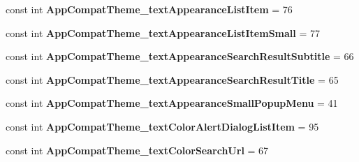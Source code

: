 \begin{DoxyCompactItemize}
\item 
\mbox{\label{class_sample_app_1_1_droid_1_1_resource_1_1_styleable_a657ffddd9420e1368d24740063a49692}} 
const int {\bfseries App\+Compat\+Theme\+\_\+text\+Appearance\+List\+Item} = 76
\item 
\mbox{\label{class_sample_app_1_1_droid_1_1_resource_1_1_styleable_a0c5ccfd82d5811970eedebaaf4e9ea7a}} 
const int {\bfseries App\+Compat\+Theme\+\_\+text\+Appearance\+List\+Item\+Small} = 77
\item 
\mbox{\label{class_sample_app_1_1_droid_1_1_resource_1_1_styleable_a68c57e4969f1bf7855de4f025a327394}} 
const int {\bfseries App\+Compat\+Theme\+\_\+text\+Appearance\+Search\+Result\+Subtitle} = 66
\item 
\mbox{\label{class_sample_app_1_1_droid_1_1_resource_1_1_styleable_a83d3dab79b3a71a6382c7b104a3077d1}} 
const int {\bfseries App\+Compat\+Theme\+\_\+text\+Appearance\+Search\+Result\+Title} = 65
\item 
\mbox{\label{class_sample_app_1_1_droid_1_1_resource_1_1_styleable_ab5bf788f6ed2ac449275bcbe26cb048b}} 
const int {\bfseries App\+Compat\+Theme\+\_\+text\+Appearance\+Small\+Popup\+Menu} = 41
\item 
\mbox{\label{class_sample_app_1_1_droid_1_1_resource_1_1_styleable_afeb3f5ceb4c055f4ff84f5b816b95368}} 
const int {\bfseries App\+Compat\+Theme\+\_\+text\+Color\+Alert\+Dialog\+List\+Item} = 95
\item 
\mbox{\label{class_sample_app_1_1_droid_1_1_resource_1_1_styleable_a19f2a35979e016ae995c5389b6a549c1}} 
const int {\bfseries App\+Compat\+Theme\+\_\+text\+Color\+Search\+Url} = 67
\item 
\mbox{\label{class_sample_app_1_1_droid_1_1_resource_1_1_styleable_a66fbe079d2becb1b9b723f02e37429fa}} 

\end{DoxyCompactItemize}

